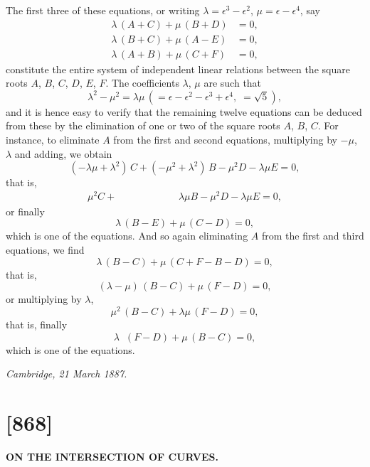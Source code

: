 \documentclass[12pt,a4paper]{article}
\theoremstyle{definition}
\begin{document}
The first three of these equations, or writing $\lambda = \epsilon^3 - \epsilon^2$,
$\mu = \epsilon - \epsilon^4$, say
\begin{align*}
\lambda\,(A + C) + \mu\,(B + D) &= 0,\\
\lambda\,(B + C) + \mu\,(A - E) &= 0,\\
\lambda\,(A + B) + \mu\,(C + F) &= 0,
\end{align*}
constitute the entire system of independent linear relations between the square roots
$A$, $B$, $C$, $D$, $E$, $F$. The coefficients $\lambda$, $\mu$ are such that
\[
\lambda^2 - \mu^2 = \lambda\mu\, (= \epsilon - \epsilon^2 - \epsilon^3 + \epsilon^4,\; = \sqrt{5}),
\]
and it is hence easy to verify that the remaining twelve equations can be deduced
from these by the elimination of one or two of the square roots $A$, $B$, $C$. For
instance, to eliminate $A$ from the first and second equations, multiplying by $-\mu$, $\lambda$
and adding, we obtain
\[
(-\lambda\mu + \lambda^2)\, C + (-\mu^2 + \lambda^2)\, B - \mu^2 D - \lambda\mu E = 0,
\]
that is,
\[
\mu^2 C + \phantom{(-\mu^2 + \lambda^2)\,}\; \lambda\mu B - \mu^2 D - \lambda\mu E = 0,
\]
or finally
\[
\lambda\,(B - E) + \mu\,(C - D) = 0,
\]
which is one of the equations. And so again eliminating $A$ from the first and
third equations, we find
\[
\lambda\,(B - C) + \mu\,(C + F - B - D) = 0,
\]
that is,
\[
(\lambda - \mu)\,(B - C) + \mu\,(F - D) = 0,
\]
or multiplying by $\lambda$,
\[
\mu^2\,(B - C) + \lambda\mu\,(F - D) = 0,
\]
that is, finally
\[
\lambda\phantom{^2}\,(F - D) + \mu\,(B - C) = 0,
\]
which is one of the equations.

\begin{flushright}
\textit{Cambridge, 21 March 1887.}
\end{flushright}

\newpage
\section*{[868]}
\begin{center}
\large\textbf{ON THE INTERSECTION OF CURVES.}
\end{center}

\begin{flushright}
\end{flushright}
\end{document}
